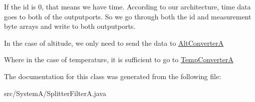 If the id is 0, that means we have time. According to our architecture, time data goes to both of the outputports. So we go through both the id and measurement byte arrays and write to both outputports.

In the case of altitude, we only need to send the data to \hyperlink{class_system_a_1_1_alt_converter_a}{Alt\+Converter\+A}

Where in the case of temperature, it is sufficient to go to \hyperlink{class_system_a_1_1_temp_converter_a}{Temp\+Converter\+A}

The documentation for this class was generated from the following file\+:\begin{DoxyCompactItemize}
\item 
src/\+System\+A/Splitter\+Filter\+A.\+java\end{DoxyCompactItemize}
